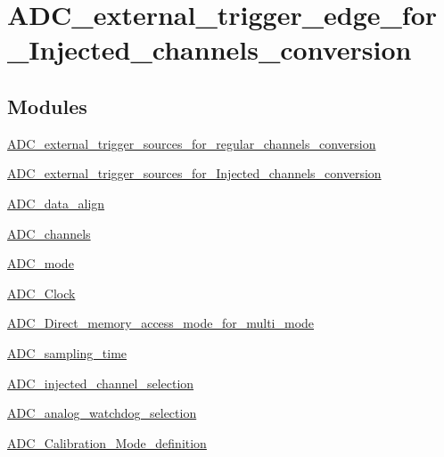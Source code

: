 \hypertarget{group___a_d_c__external__trigger__edge__for___injected__channels__conversion}{\section{A\-D\-C\-\_\-external\-\_\-trigger\-\_\-edge\-\_\-for\-\_\-\-Injected\-\_\-channels\-\_\-conversion}
\label{group___a_d_c__external__trigger__edge__for___injected__channels__conversion}
}
\subsection*{Modules}
\begin{DoxyCompactItemize}
\item 
\hyperlink{group___a_d_c__external__trigger__sources__for__regular__channels__conversion}{A\-D\-C\-\_\-external\-\_\-trigger\-\_\-sources\-\_\-for\-\_\-regular\-\_\-channels\-\_\-conversion}
\item 
\hyperlink{group___a_d_c__external__trigger__sources__for___injected__channels__conversion}{A\-D\-C\-\_\-external\-\_\-trigger\-\_\-sources\-\_\-for\-\_\-\-Injected\-\_\-channels\-\_\-conversion}
\item 
\hyperlink{group___a_d_c__data__align}{A\-D\-C\-\_\-data\-\_\-align}
\item 
\hyperlink{group___a_d_c__channels}{A\-D\-C\-\_\-channels}
\item 
\hyperlink{group___a_d_c__mode}{A\-D\-C\-\_\-mode}
\item 
\hyperlink{group___a_d_c___clock}{A\-D\-C\-\_\-\-Clock}
\item 
\hyperlink{group___a_d_c___direct__memory__access__mode__for__multi__mode}{A\-D\-C\-\_\-\-Direct\-\_\-memory\-\_\-access\-\_\-mode\-\_\-for\-\_\-multi\-\_\-mode}
\item 
\hyperlink{group___a_d_c__sampling__time}{A\-D\-C\-\_\-sampling\-\_\-time}
\item 
\hyperlink{group___a_d_c__injected__channel__selection}{A\-D\-C\-\_\-injected\-\_\-channel\-\_\-selection}
\item 
\hyperlink{group___a_d_c__analog__watchdog__selection}{A\-D\-C\-\_\-analog\-\_\-watchdog\-\_\-selection}
\item 
\hyperlink{group___a_d_c___calibration___mode__definition}{A\-D\-C\-\_\-\-Calibration\-\_\-\-Mode\-\_\-definition}

\end{DoxyCompactItemize}
